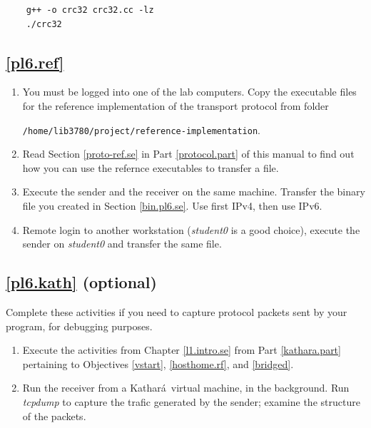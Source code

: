 \documentclass[12pt]{book}
\newcommand{\kathara}{Kathar\'a}
\begin{document}
\begin{enumerate}[label=\arabic*.]
\begin{enumerate}[resume*]
  \begin{lstlisting}
    g++ -o crc32 crc32.cc -lz
    ./crc32
  \end{lstlisting}

\end{enumerate}


\subsection{\ref{pl6.ref}}

\begin{enumerate}[resume*]
\item You must be logged into one of the lab computers. Copy the executable files for the reference implementation of the transport protocol from folder

  \verb$/home/lib3780/project/reference-implementation$.

\item Read Section \ref{proto-ref.se} in Part \ref*{protocol.part} of this manual to find out how you can use the refernce executables to transfer a file.

\item Execute the sender and the receiver on the same machine. Transfer the binary file you created in Section \ref{bin.pl6.se}. Use first IPv4, then use IPv6.

\item Remote login to another workstation (\emph{student0} is a good choice), execute the sender on \emph{student0} and transfer the same file.
\end{enumerate}


\subsection{\ref{pl6.kath} (optional)}

Complete these activities if you need to capture protocol packets sent by your program, for debugging purposes.

\begin{enumerate}[resume*]
\item Execute the activities from Chapter \ref{l1.intro.se} from Part \ref{kathara.part} pertaining to Objectives \ref{vstart}, \ref{hosthome.rf}, and \ref{bridged}.

\item Run the receiver from a \kathara\ virtual machine, in the background. Run \emph{tcpdump} to capture the trafic generated by the sender; examine the structure of the packets.
\end{enumerate}



\end{enumerate}
\end{document}
